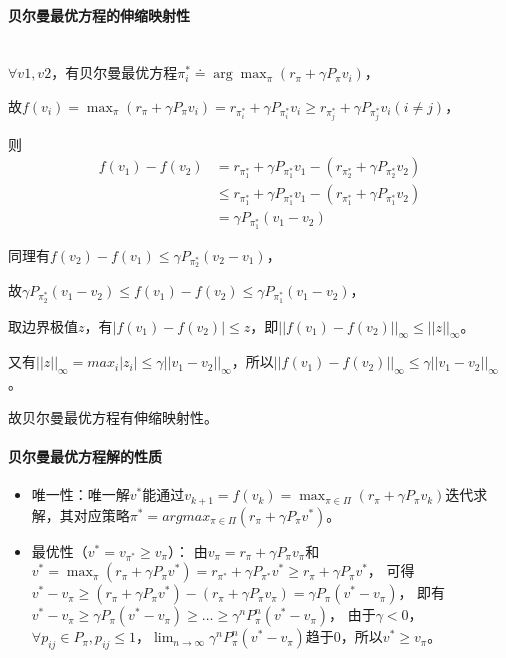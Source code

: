 \documentclass[
12pt, %
a4paper, 
oneside, %
headinclude,footinclude, %
]{scrartcl}
\begin{document}
\paragraph{贝尔曼最优方程的伸缩映射性}~\\

$ \forall v1,v2 $，有贝尔曼最优方程$ \pi_i^* \doteq \arg \max_{\pi} (r_\pi + \gamma P_\pi v_i) $，

故$ f(v_i) = \max_{\pi} (r_\pi + \gamma P_\pi v_i) = r_{\pi_i^*} + \gamma P_{\pi_i^*} v_i \geq r_{\pi_j^*} + \gamma P_{\pi_j^*} v_i (i \neq j) $，

则
\begin{align*}
f(v_1) - f(v_2) 
&= r_{\pi_1^*} + \gamma P_{\pi_1^*} v_1 - (r_{\pi_2^*} + \gamma P_{\pi_2^*} v_2) \\
&\leq r_{\pi_1^*} + \gamma P_{\pi_1^*} v_1 - (r_{\pi_1^*} + \gamma P_{\pi_1^*} v_2) \\
&= \gamma P_{\pi_1^*} (v_1 - v_2)
\end{align*}

同理有$ f(v_2) - f(v_1) \leq \gamma P_{\pi_2^*} (v_2 - v_1) $，

故$ \gamma P_{\pi_2^*} (v_1 - v_2)\leq f(v_1) - f(v_2) \leq \gamma P_{\pi_1^*} (v_1 - v_2) $，

取边界极值$ z $，有$ |f(v_1) - f(v_2)| \leq z $，即$ ||f(v_1) - f(v_2)||_\infty \leq ||z||_\infty $。

又有$ ||z||_\infty = max_i |z_i| \leq \gamma ||v_1 - v_2||_\infty $，所以$ ||f(v_1) - f(v_2)||_\infty \leq \gamma ||v_1 - v_2||_\infty $。

故贝尔曼最优方程有伸缩映射性。
\paragraph{贝尔曼最优方程解的性质}
\begin{itemize}
\item 唯一性：唯一解$ v^* $能通过$ v_{k + 1} = f(v_k) = \max_{\pi \in \Pi} (r_\pi + \gamma P_\pi v_k) $迭代求解，其对应策略$ \pi^* = argmax_{\pi \in \Pi} (r_\pi + \gamma P_\pi v^*) $。
\item 最优性（$ v^* = v_{\pi^*} \geq v_{\pi} $）：
由$ v_{\pi} = r_{\pi} + \gamma P_{\pi} v_{\pi} $和$ v^* = \max_{\pi} (r_{\pi} + \gamma P_{\pi} v^*) = r_{\pi^*} + \gamma P_{\pi^*} v^* \geq r_{\pi} + \gamma P_{\pi} v^* $，
可得$ v^* - v_{\pi} \geq (r_{\pi} + \gamma P_{\pi} v^*) - (r_{\pi} + \gamma P_{\pi} v_{\pi}) = \gamma P_{\pi} (v^* - v_{\pi}) $，
即有$ v^* - v_{\pi} \geq \gamma P_{\pi} (v^* - v_{\pi}) \geq \dots \geq \gamma^n P_{\pi}^n (v^* - v_{\pi}) $，
由于$ \gamma < 0 $，$ \forall p_{ij} \in P_{\pi}, p_{ij} \leq 1 $，$ \lim_{n \to \infty} \gamma^n P_{\pi}^n (v^* - v_{\pi}) $趋于0，所以$ v^* \geq v_{\pi} $。
\end{itemize}
\end{document}
